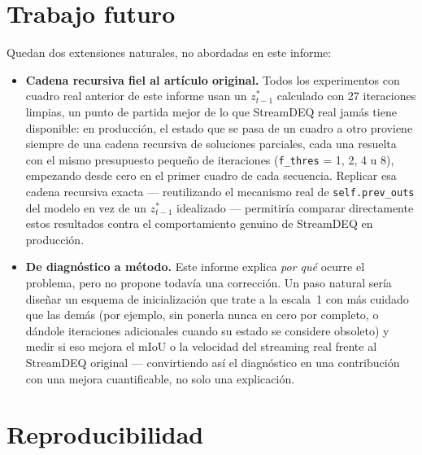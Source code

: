 \documentclass[11pt,a4paper]{article}
\newcommand{\code}[1]{\texttt{#1}}
\begin{document}
\section{Trabajo futuro}

Quedan dos extensiones naturales, no abordadas en este informe:

\begin{itemize}
  \item \textbf{Cadena recursiva fiel al artículo original.} Todos los experimentos con cuadro real
    anterior de este informe usan un $z^*_{t-1}$ calculado con 27 iteraciones limpias, un punto de
    partida mejor de lo que StreamDEQ real jamás tiene disponible: en producción, el estado que se
    pasa de un cuadro a otro proviene siempre de una cadena recursiva de soluciones parciales, cada
    una resuelta con el mismo presupuesto pequeño de iteraciones (\code{f\_thres} = 1, 2, 4 u 8),
    empezando desde cero en el primer cuadro de cada secuencia. Replicar esa cadena recursiva
    exacta --- reutilizando el mecanismo real de \code{self.prev\_outs} del modelo en vez de un
    $z^*_{t-1}$ idealizado --- permitiría comparar directamente estos resultados contra el
    comportamiento genuino de StreamDEQ en producción.
  \item \textbf{De diagnóstico a método.} Este informe explica \emph{por qué} ocurre el problema,
    pero no propone todavía una corrección. Un paso natural sería diseñar un esquema de
    inicialización que trate a la escala~1 con más cuidado que las demás (por ejemplo, sin
    ponerla nunca en cero por completo, o dándole iteraciones adicionales cuando su estado se
    considere obsoleto) y medir si eso mejora el mIoU o la velocidad del streaming real frente al
    StreamDEQ original --- convirtiendo así el diagnóstico en una contribución con una mejora
    cuantificable, no solo una explicación.
\end{itemize}


\section*{Reproducibilidad}
\end{document}
